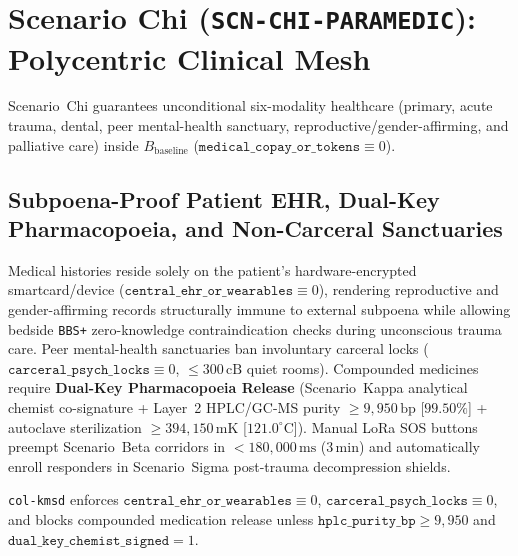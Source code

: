 \section{Scenario Chi (\texttt{SCN-CHI-PARAMEDIC}): Polycentric Clinical Mesh}
\label{sec:wavef-chi}

Scenario~Chi guarantees unconditional six-modality healthcare (primary, acute trauma, dental,
peer mental-health sanctuary, reproductive/gender-affirming, and palliative care) inside
$B_{\mathrm{baseline}}$ ($\mathtt{medical\_copay\_or\_tokens} \equiv 0$).

\subsection{Subpoena-Proof Patient EHR, Dual-Key Pharmacopoeia, and Non-Carceral Sanctuaries}

Medical histories reside solely on the patient's hardware-encrypted smartcard/device
($\mathtt{central\_ehr\_or\_wearables} \equiv 0$), rendering reproductive and gender-affirming records
structurally immune to external subpoena while allowing bedside \texttt{BBS+} zero-knowledge
contraindication checks during unconscious trauma care. Peer mental-health sanctuaries ban involuntary
carceral locks ($\mathtt{carceral\_psych\_locks} \equiv 0$, $\le 300\,\mathrm{cB}$ quiet rooms).
Compounded medicines require \textbf{Dual-Key Pharmacopoeia Release} (Scenario~Kappa analytical chemist
co-signature + Layer~2 HPLC/GC-MS purity $\ge 9{,}950\,\mathrm{bp}$ [$99.50\%$] + autoclave
sterilization $\ge 394{,}150\,\mathrm{mK}$ [$121.0^\circ\mathrm{C}$]). Manual LoRa SOS buttons
preempt Scenario~Beta corridors in $< 180{,}000\,\mathrm{ms}$ ($3\,\mathrm{min}$) and automatically
enroll responders in Scenario~Sigma post-trauma decompression shields.

\begin{invariant}
\label{inv:wavef-chi-clinic}
\texttt{col-kmsd} enforces $\mathtt{central\_ehr\_or\_wearables} \equiv 0$, $\mathtt{carceral\_psych\_locks} \equiv 0$,
and blocks compounded medication release unless $\mathtt{hplc\_purity\_bp} \ge 9{,}950$ and
$\mathtt{dual\_key\_chemist\_signed} = 1$.
\end{invariant}

